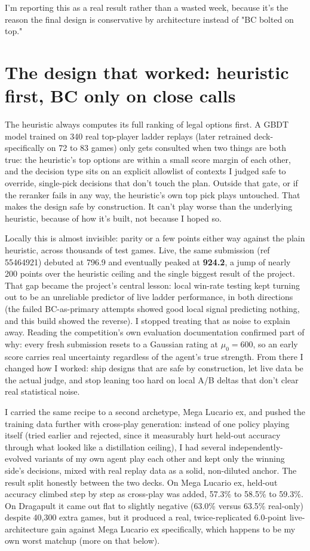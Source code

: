 \documentclass[11pt]{article}
\begin{document}
I'm reporting this as a real result rather than a wasted week, because it's the reason the final design is conservative by architecture instead of "BC bolted on top."

\section*{The design that worked: heuristic first, BC only on close calls}

The heuristic always computes its full ranking of legal options first. A GBDT model trained on 340 real top-player ladder replays (later retrained deck-specifically on 72 to 83 games) only gets consulted when two things are both true: the heuristic's top options are within a small score margin of each other, and the decision type sits on an explicit allowlist of contexts I judged safe to override, single-pick decisions that don't touch the plan. Outside that gate, or if the reranker fails in any way, the heuristic's own top pick plays untouched. That makes the design safe by construction. It can't play worse than the underlying heuristic, because of how it's built, not because I hoped so.

Locally this is almost invisible: parity or a few points either way against the plain heuristic, across thousands of test games. Live, the same submission (ref 55464921) debuted at 796.9 and eventually peaked at \textbf{924.2}, a jump of nearly 200 points over the heuristic ceiling and the single biggest result of the project. That gap became the project's central lesson: local win-rate testing kept turning out to be an unreliable predictor of live ladder performance, in both directions (the failed BC-as-primary attempts showed good local signal predicting nothing, and this build showed the reverse). I stopped treating that as noise to explain away. Reading the competition's own evaluation documentation confirmed part of why: every fresh submission resets to a Gaussian rating at $\mu_0=600$, so an early score carries real uncertainty regardless of the agent's true strength. From there I changed how I worked: ship designs that are safe by construction, let live data be the actual judge, and stop leaning too hard on local A/B deltas that don't clear real statistical noise.

I carried the same recipe to a second archetype, Mega Lucario ex, and pushed the training data further with cross-play generation: instead of one policy playing itself (tried earlier and rejected, since it measurably hurt held-out accuracy through what looked like a distillation ceiling), I had several independently-evolved variants of my own agent play each other and kept only the winning side's decisions, mixed with real replay data as a solid, non-diluted anchor. The result split honestly between the two decks. On Mega Lucario ex, held-out accuracy climbed step by step as cross-play was added, 57.3\% to 58.5\% to 59.3\%. On Dragapult it came out flat to slightly negative (63.0\% versus 63.5\% real-only) despite 40,300 extra games, but it produced a real, twice-replicated 6.0-point live-architecture gain against Mega Lucario ex specifically, which happens to be my own worst matchup (more on that below).
\end{document}
